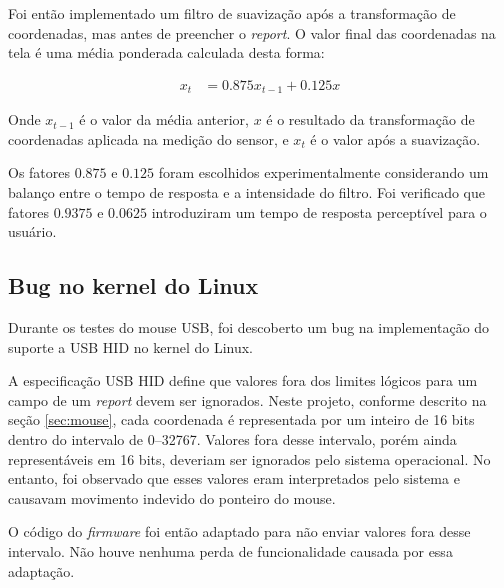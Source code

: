 \documentclass[brazil,pagestart=firstchapter]{abnt}
\begin{document}
Foi então implementado um filtro de suavização após a transformação de
coordenadas, mas antes de preencher o \textit{report}. O valor final das
coordenadas na tela é uma média ponderada calculada desta forma:

\begin{align*}
\label{eq:filtro_media_ponderada}
x_t & = 0.875 x_{t-1} + 0.125 x
\end{align*}

Onde $x_{t-1}$ é o valor da média anterior, $x$ é o resultado da
transformação de coordenadas aplicada na medição do sensor, e $x_t$ é o
valor após a suavização.




Os fatores $0.875$ e $0.125$ foram escolhidos experimentalmente considerando
um balanço entre o tempo de resposta e a intensidade do filtro. Foi
verificado que fatores $0.9375$ e $0.0625$ introduziram um tempo de resposta
perceptível para o usuário.


\subsection{Bug no kernel do Linux}
\label{sub:linux_hid_bug}

Durante os testes do mouse \ac{USB}, foi descoberto um bug na implementação
do suporte a \ac{USB} \ac{HID} no kernel do Linux.

A especificação \ac{USB} \ac{HID} define que valores fora dos limites
lógicos para um campo de um \textit{report} devem ser ignorados.
\cite[p.~20]{usbhid} Neste projeto, conforme descrito na seção
\ref{sec:mouse}, cada coordenada é representada por um inteiro de 16 bits
dentro do intervalo de \numrange{0}{32767}. Valores fora desse intervalo,
porém ainda representáveis em 16 bits, deveriam ser ignorados pelo sistema
operacional. No entanto, foi observado que esses valores eram interpretados
pelo sistema e causavam movimento indevido do ponteiro do mouse.

O código do \textit{firmware} foi então adaptado para não enviar valores
fora desse intervalo. Não houve nenhuma perda de funcionalidade causada por
essa adaptação.
\end{document}
